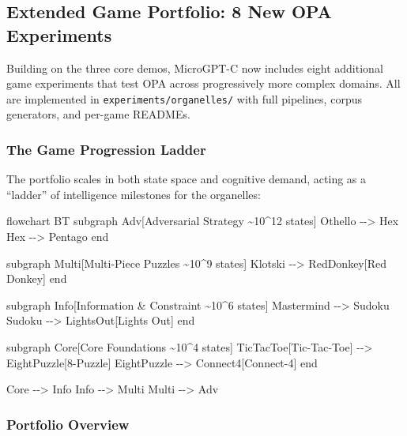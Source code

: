 \documentclass[
]{article}
\newenvironment{Shaded}{}{}
\newcommand{\NormalTok}[1]{#1}
\begin{document}
\subsection{Extended Game Portfolio: 8 New OPA
Experiments}\label{extended-game-portfolio-8-new-opa-experiments}

Building on the three core demos, MicroGPT-C now includes eight
additional game experiments that test OPA across progressively more
complex domains. All are implemented in \texttt{experiments/organelles/}
with full pipelines, corpus generators, and per-game READMEs.

\subsubsection{The Game Progression
Ladder}\label{the-game-progression-ladder}

The portfolio scales in both state space and cognitive demand, acting as
a ``ladder'' of intelligence milestones for the organelles:

\begin{Shaded}
\begin{Highlighting}[]
\NormalTok{flowchart BT}
\NormalTok{    subgraph Adv[Adversarial Strategy \textasciitilde{}10\^{}12 states]}
\NormalTok{        Othello {-}{-}\textgreater{} Hex}
\NormalTok{        Hex {-}{-}\textgreater{} Pentago}
\NormalTok{    end}
    
\NormalTok{    subgraph Multi[Multi{-}Piece Puzzles \textasciitilde{}10\^{}9 states]}
\NormalTok{        Klotski {-}{-}\textgreater{} RedDonkey[Red Donkey]}
\NormalTok{    end}
    
\NormalTok{    subgraph Info[Information \& Constraint \textasciitilde{}10\^{}6 states]}
\NormalTok{        Mastermind {-}{-}\textgreater{} Sudoku}
\NormalTok{        Sudoku {-}{-}\textgreater{} LightsOut[Lights Out]}
\NormalTok{    end}
    
\NormalTok{    subgraph Core[Core Foundations \textasciitilde{}10\^{}4 states]}
\NormalTok{        TicTacToe[Tic{-}Tac{-}Toe] {-}{-}\textgreater{} EightPuzzle[8{-}Puzzle]}
\NormalTok{        EightPuzzle {-}{-}\textgreater{} Connect4[Connect{-}4]}
\NormalTok{    end}
    
\NormalTok{    Core {-}{-}\textgreater{} Info}
\NormalTok{    Info {-}{-}\textgreater{} Multi}
\NormalTok{    Multi {-}{-}\textgreater{} Adv}
\end{Highlighting}
\end{Shaded}

\subsubsection{Portfolio Overview}\label{portfolio-overview}
\end{document}
